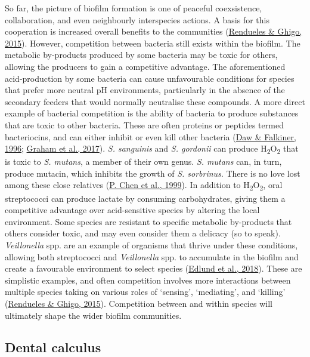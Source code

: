 \documentclass[
  letterpaper,
]{book}
\begin{document}
So far, the picture of biofilm formation is one of peaceful
coexsistence, collaboration, and even neighbourly interspecies actions.
A basis for this cooperation is increased overall benefits to the
communities
(\protect\hyperlink{ref-renduelesMechanismsCompetition2015}{Rendueles \&
Ghigo, 2015}). However, competition between bacteria still exists within
the biofilm. The metabolic by-products produced by some bacteria may be
toxic for others, allowing the producers to gain a competitive
advantage. The aforementioned acid-production by some bacteria can cause
unfavourable conditions for species that prefer more neutral pH
environments, particularly in the absence of the secondary feeders that
would normally neutralise these compounds. A more direct example of
bacterial competition is the ability of bacteria to produce substances
that are toxic to other bacteria. These are often proteins or peptides
termed bacteriocins, and can either inhibit or even kill other bacteria
(\protect\hyperlink{ref-dawBacteriocinsNature1996}{Daw \& Falkiner,
1996}; \protect\hyperlink{ref-grahamEnterococcusFaecalis2017}{Graham et
al., 2017}). \emph{S. sanguinis} and \emph{S. gordonii} can produce
H\textsubscript{2}O\textsubscript{2} that is toxic to \emph{S. mutans},
a member of their own genus. \emph{S. mutans} can, in turn, produce
mutacin, which inhibits the growth of \emph{S. sorbrinus}. There is no
love lost among these close relatives
(\protect\hyperlink{ref-chenSpecificGenes1999}{P. Chen et al., 1999}).
In addition to H\textsubscript{2}O\textsubscript{2}, oral streptococci
can produce lactate by consuming carbohydrates, giving them a
competitive advantage over acid-sensitive species by altering the local
environment. Some species are resistant to specific metabolic
by-products that others consider toxic, and may even consider them a
delicacy (so to speak). \emph{Veillonella} spp. are an example of
organisms that thrive under these conditions, allowing both streptococci
and \emph{Veillonella} spp. to accumulate in the biofilm and create a
favourable environment to select species
(\protect\hyperlink{ref-edlundUncoveringComplex2018}{Edlund et al.,
2018}). These are simplistic examples, and often competition involves
more interactions between multiple species taking on various roles of
`sensing', `mediating', and `killing'
(\protect\hyperlink{ref-renduelesMechanismsCompetition2015}{Rendueles \&
Ghigo, 2015}). Competition between and within species will ultimately
shape the wider biofilm communities.

\hypertarget{dental-calculus}{%
\subsection{Dental calculus}\label{dental-calculus}}
\end{document}
